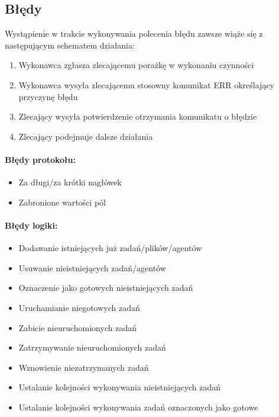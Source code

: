 \documentclass[10pt,a4paper]{article}
\begin{document}
        \subsection{Błędy}
            Wystąpienie w trakcie wykonywania polecenia błędu zawsze wiąże się z następującym schematem działania:
            
            \begin{enumerate}
	            \item Wykonawca zgłasza zlecającemu porażkę w wykonaniu czynności
	            \item Wykonawca wysyła zlecającemu stosowny komunikat ERR określający przyczynę błędu
	            \item Zlecający wysyła potwierdzenie otrzymania komunikatu o błędzie
	            \item Zlecający podejmuje dalsze działania  
            \end{enumerate}
            
            \paragraph{Błędy protokołu:}
            
            \begin{itemize}
	            \item Za długi/za krótki nagłówek
	            \item Zabronione wartości pól 
            \end{itemize}
            
            \paragraph{Błędy logiki:}
            
            \begin{itemize}
	            \item Dodawanie istniejących już zadań/plików/agentów
	            \item Usuwanie nieistniejących zadań/agentów
	            \item Oznaczenie jako gotowych nieistniejących zadań
	            \item Uruchamianie niegotowych zadań
	            \item Zabicie nieuruchomionych zadań
	            \item Zatrzymywanie nieuruchomionych zadań
	            \item Wznowienie niezatrzymanych zadań
	            \item Ustalanie kolejności wykonywania nieistniejących zadań
	            \item Ustalanie kolejności wykonywania zadań oznaczonych jako gotowe
            \end{itemize}
            
\end{document}
